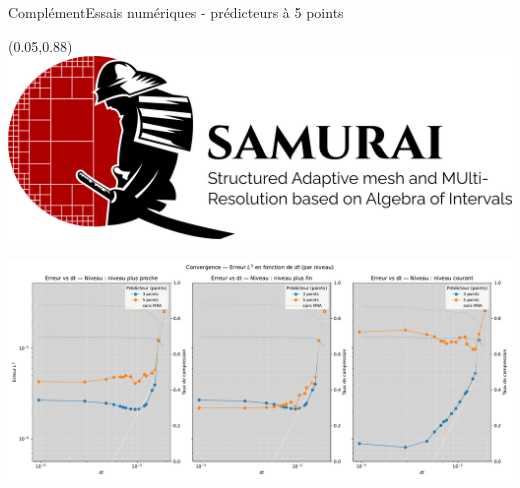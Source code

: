 \begin{frame}{Complément}{Essais numériques - prédicteurs à 5 points}
    \begin{textblock*}{40pt}(0.05\paperwidth,0.88\paperheight)\includegraphics[scale=.03]{medias/2_/1_/light_logo.png}\end{textblock*}
    \includegraphics[width = \textwidth]{medias/3_/error_vs_dt_by_stencil_per_mlf.pdf}
\end{frame}